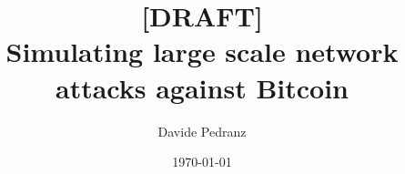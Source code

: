 \documentclass[11pt, a4paper]{report}
\title{[DRAFT]\\Simulating large scale network attacks against Bitcoin}
\author{Davide Pedranz}
\date{\today}
\begin{document}
\begin{titlepage}
	\maketitle
\end{titlepage}



\tableofcontents
\listoffigures
\listoftables






\printbibliography
\end{document}

